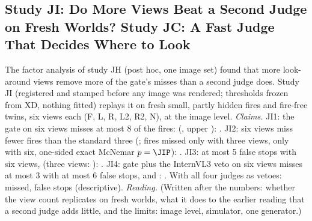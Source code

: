 \subsection{Study JI: Do More Views Beat a Second Judge on Fresh Worlds? Study JC: A Fast Judge That Decides Where to Look}\label{sec:moved-ji}
The factor analysis of study JH (post hoc, one image set) found that more look-around views remove more of the gate's misses than a second judge does. Study JI (registered and stamped before any image was rendered; thresholds frozen from XD, nothing fitted) replays it on \JIFire{} fresh small, partly hidden fires and \JIClean{} fire-free twins, six views each (F, L, R, L2, R2, N), at the image level.
\emph{Claims.} JI1: the gate on six views misses at most 8 of the fires: \JISix{} (\JISixRate, upper \JISixUpper): \JIOneHolds. JI2: six views miss fewer fires than the standard three (\JIThree{}; \JIOnlyThree{} fires missed only with three views, \JIOnlySix{} only with six, one-sided exact McNemar $p=\JIP$): \JITwoHolds. JI3: at most 5 false stops with six views, \JISixFS{} (three views: \JIThreeFS): \JIThreeHolds. JI4: gate plus the InternVL3 veto on six views misses at most 3 with at most 6 false stops, \JIVetoMiss{} and \JIVetoFS: \JIFourHolds. With all four judges as vetoes: \JIAllMiss{} missed, \JIAllFS{} false stops (descriptive).
\emph{Reading.} (Written after the numbers: whether the view count replicates on fresh worlds, what it does to the earlier reading that a second judge adds little, and the limits: image level, simulator, one generator.)

